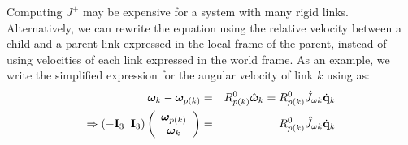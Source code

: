 Computing $J^+$ may be expensive for a system with many rigid links. 
Alternatively, we can rewrite the equation using the relative velocity between a child and a parent link expressed in the local
frame of the parent, instead of using velocities of each link
expressed in the world frame. As an example, we write the simplified expression for the angular velocity of link $k$ using  as: 
\begin{eqnarray}
\nonumber
\bm{\omega}_k - \bm{\omega}_{p(k)} & = & R^0_{p(k)}\hat{\bm{\omega}}_k = R^0_{p(k)}\hat{J}_{\omega k} \dot{\mathbf{q}}_k \\
\Rightarrow \left ( -\mathbf{I}_3\;\; \mathbf{I}_3 \right ) 
\left ( 
\begin{array}{c}
\bm{\omega}_{p(k)}\\
\bm{\omega}_k
\end{array}
\right ) & = & R^0_{p(k)}\hat{J}_{\omega k} \dot{\mathbf{q}}_k
\end{eqnarray}


